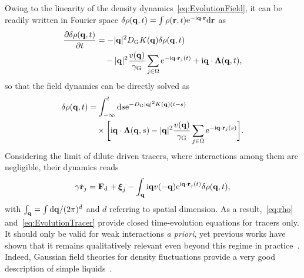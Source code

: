 \documentclass[superscriptaddress, twocolumn, prx, longbibliography, nofootinbib]{revtex4-1}
\newcommand{\dd}{\text{d}}
\newcommand{\ee}{\text{e}}
\newcommand{\ii}{\text{i}}
\begin{document}
Owing to the linearity of the density dynamics~\eqref{eq:EvolutionField}, it can be readily written in Fourier space $\delta\rho({\bf q},t)=\int\rho({\bf r},t){\rm e}^{-{\rm i}{\bf q}\cdot{\bf r}} {\rm d}{\bf r}$ as
\begin{equation}\label{eq:FourierEvolutionField}
	\begin{aligned}
		\frac{\partial \delta \rho({\bf q},t)}{\partial t} &= - |{\bf q}|^2 D_{\rm G} K({\bf q}) \delta \rho({\bf q},t)
		\\
		&\quad - |{\bf q}|^2 \frac{v({\bf q})}{\gamma_{\rm G}} \sum_{j\in\Omega}\ee^{-\ii {\bf q} \cdot {\bf r}_j(t)} + \ii{\bf q}\cdot{\boldsymbol\Lambda} ({\bf q},t) ,
	\end{aligned}
\end{equation}
so that the field dynamics can be directly solved as
\begin{equation}\label{eq:rho}
	\begin{aligned}
		\delta\rho({\bf q},t) &= \int_{-\infty}^t \dd s \ee^{-D_{\rm G} |{\bf q}|^2 K({\bf q})(t-s)}
		\\
		&\quad\times \bigg[ \ii{\bf q} \cdot {\boldsymbol\Lambda}({\bf q},s) - |{\bf q}|^2 \frac{v({\bf q})}{\gamma_{\rm G}} \sum_{j\in\Omega}\ee^{-\ii {\bf q}\cdot {\bf r}_j(s)}\bigg] .
	\end{aligned}
\end{equation}
Considering the limit of dilute driven tracers, where interactions among them are negligible, their dynamics reads
\begin{equation}\label{eq:EvolutionTracer}
	\gamma\dot{\bf r}_j = {\bf F}_\text{d} + {\boldsymbol\xi_j} - \int_{\bf q} \ii{\bf q} v(-{\bf q})\ee^{\ii{\bf q} \cdot {\bf r}_j(t)} \delta \rho({\bf q}, t) ,
\end{equation}
with $\int_{\bf q}=\int\dd{\bf q}/(2\pi)^d$ and $d$ referring to spatial dimension. As a result,~\eqref{eq:rho} and~\eqref{eq:EvolutionTracer} provide closed time-evolution equations for tracers only. It should only be valid for weak interactions {\it a priori}, yet previous works have shown that it remains qualitatively relevant even beyond this regime in practice~\cite{Demery2015, Martin2018, Demery2019}. Indeed, Gaussian field theories for density fluctuations provide a very good description of simple liquids~\cite{Chandler1993}.
\end{document}
